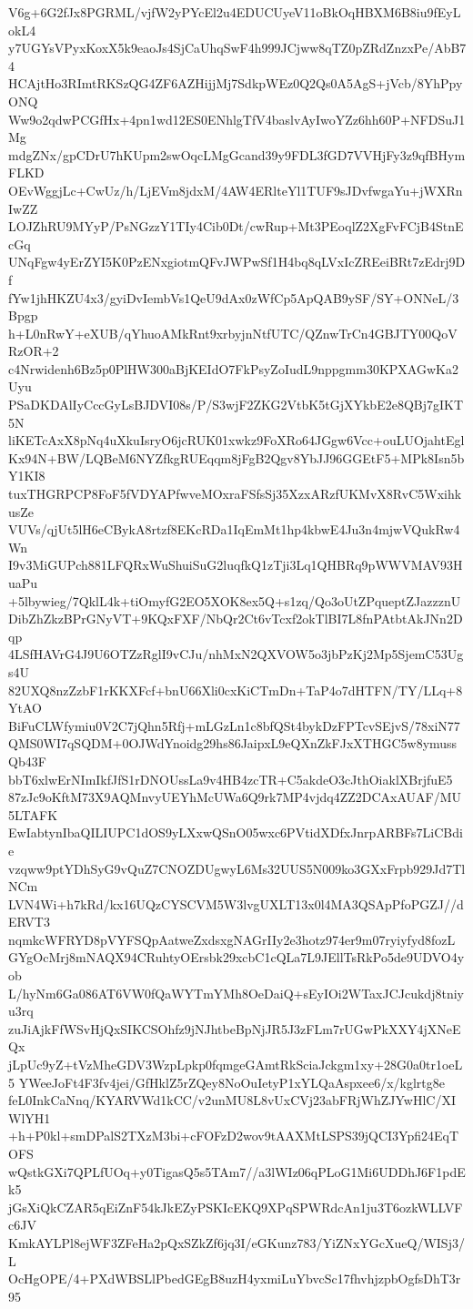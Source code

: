 V6g+6G2fJx8PGRML/vjfW2yPYcEl2u4EDUCUyeV11oBkOqHBXM6B8iu9fEyLokL4
y7UGYsVPyxKoxX5k9eaoJs4SjCaUhqSwF4h999JCjww8qTZ0pZRdZnzxPe/AbB74
HCAjtHo3RImtRKSzQG4ZF6AZHijjMj7SdkpWEz0Q2Qs0A5AgS+jVcb/8YhPpyONQ
Ww9o2qdwPCGfHx+4pn1wd12ES0ENhlgTfV4baslvAyIwoYZz6hh60P+NFDSuJ1Mg
mdgZNx/gpCDrU7hKUpm2swOqcLMgGcand39y9FDL3fGD7VVHjFy3z9qfBHymFLKD
OEvWggjLc+CwUz/h/LjEVm8jdxM/4AW4ERlteYl1TUF9sJDvfwgaYu+jWXRnIwZZ
LOJZhRU9MYyP/PsNGzzY1TIy4Cib0Dt/cwRup+Mt3PEoqlZ2XgFvFCjB4StnEcGq
UNqFgw4yErZYI5K0PzENxgiotmQFvJWPwSf1H4bq8qLVxIcZREeiBRt7zEdrj9Df
fYw1jhHKZU4x3/gyiDvIembVs1QeU9dAx0zWfCp5ApQAB9ySF/SY+ONNeL/3Bpgp
h+L0nRwY+eXUB/qYhuoAMkRnt9xrbyjnNtfUTC/QZnwTrCn4GBJTY00QoVRzOR+2
c4Nrwidenh6Bz5p0PlHW300aBjKEIdO7FkPsyZoIudL9nppgmm30KPXAGwKa2Uyu
PSaDKDAlIyCccGyLsBJDVI08s/P/S3wjF2ZKG2VtbK5tGjXYkbE2e8QBj7gIKT5N
liKETcAxX8pNq4uXkuIsryO6jcRUK01xwkz9FoXRo64JGgw6Vcc+ouLUOjahtEgl
Kx94N+BW/LQBeM6NYZfkgRUEqqm8jFgB2Qgv8YbJJ96GGEtF5+MPk8Isn5bY1KI8
tuxTHGRPCP8FoF5fVDYAPfwveMOxraFSfsSj35XzxARzfUKMvX8RvC5WxihkusZe
VUVs/qjUt5lH6eCBykA8rtzf8EKcRDa1IqEmMt1hp4kbwE4Ju3n4mjwVQukRw4Wn
I9v3MiGUPch881LFQRxWuShuiSuG2luqfkQ1zTji3Lq1QHBRq9pWWVMAV93HuaPu
+5lbywieg/7QklL4k+tiOmyfG2EO5XOK8ex5Q+s1zq/Qo3oUtZPqueptZJazzznU
DibZhZkzBPrGNyVT+9KQxFXF/NbQr2Ct6vTcxf2okTlBI7L8fnPAtbtAkJNn2Dqp
4LSfHAVrG4J9U6OTZzRglI9vCJu/nhMxN2QXVOW5o3jbPzKj2Mp5SjemC53Ugs4U
82UXQ8nzZzbF1rKKXFcf+bnU66Xli0cxKiCTmDn+TaP4o7dHTFN/TY/LLq+8YtAO
BiFuCLWfymiu0V2C7jQhn5Rfj+mLGzLn1c8bfQSt4bykDzFPTcvSEjvS/78xiN77
QMS0WI7qSQDM+0OJWdYnoidg29hs86JaipxL9eQXnZkFJxXTHGC5w8ymussQb43F
bbT6xlwErNImIkfJfS1rDNOUssLa9v4HB4zcTR+C5akdeO3cJthOiaklXBrjfuE5
87zJc9oKftM73X9AQMnvyUEYhMcUWa6Q9rk7MP4vjdq4ZZ2DCAxAUAF/MU5LTAFK
EwIabtynIbaQILIUPC1dOS9yLXxwQSnO05wxc6PVtidXDfxJnrpARBFs7LiCBdie
vzqww9ptYDhSyG9vQuZ7CNOZDUgwyL6Ms32UUS5N009ko3GXxFrpb929Jd7TlNCm
LVN4Wi+h7kRd/kx16UQzCYSCVM5W3lvgUXLT13x0l4MA3QSApPfoPGZJ//dERVT3
nqmkcWFRYD8pVYFSQpAatweZxdsxgNAGrIIy2e3hotz974er9m07ryiyfyd8fozL
GYgOcMrj8mNAQX94CRuhtyOErsbk29xcbC1cQLa7L9JEllTsRkPo5de9UDVO4yob
L/hyNm6Ga086AT6VW0fQaWYTmYMh8OeDaiQ+sEyIOi2WTaxJCJcukdj8tniyu3rq
zuJiAjkFfWSvHjQxSIKCSOhfz9jNJhtbeBpNjJR5J3zFLm7rUGwPkXXY4jXNeEQx
jLpUc9yZ+tVzMheGDV3WzpLpkp0fqmgeGAmtRkSciaJckgm1xy+28G0a0tr1oeL5
YWeeJoFt4F3fv4jei/GfHklZ5rZQey8NoOuIetyP1xYLQaAspxee6/x/kglrtg8e
feL0InkCaNnq/KYARVWd1kCC/v2unMU8L8vUxCVj23abFRjWhZJYwHlC/XIWlYH1
+h+P0kl+smDPalS2TXzM3bi+cFOFzD2wov9tAAXMtLSPS39jQCI3Ypfi24EqTOFS
wQstkGXi7QPLfUOq+y0TigasQ5s5TAm7//a3lWIz06qPLoG1Mi6UDDhJ6F1pdEk5
jGsXiQkCZAR5qEiZnF54kJkEZyPSKIcEKQ9XPqSPWRdcAn1ju3T6ozkWLLVFc6JV
KmkAYLPl8ejWF3ZFeHa2pQxSZkZf6jq3I/eGKunz783/YiZNxYGcXueQ/WISj3/L
OcHgOPE/4+PXdWBSLlPbedGEgB8uzH4yxmiLuYbvcSc17fhvhjzpbOgfsDhT3r95
